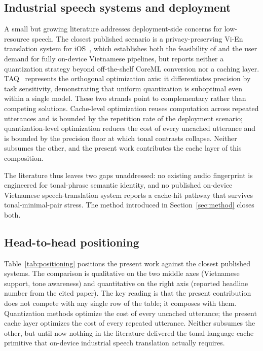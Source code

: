 \documentclass[a4paper,fleqn]{cas-dc}
\begin{document}
\subsection{Industrial speech systems and deployment}\label{sec:related:deployment}

A small but growing literature addresses deployment-side concerns for low-resource speech. The closest published scenario is a privacy-preserving Vi-En translation system for iOS~\citep{le2025privacyios}, which establishes both the feasibility of and the user demand for fully on-device Vietnamese pipelines, but reports neither a quantization strategy beyond off-the-shelf CoreML conversion nor a caching layer. TAQ~\citep{taq2025} represents the orthogonal optimization axis: it differentiates precision by task sensitivity, demonstrating that uniform quantization is suboptimal even within a single model. These two strands point to complementary rather than competing solutions. Cache-level optimization reuses computation across repeated utterances and is bounded by the repetition rate of the deployment scenario; quantization-level optimization reduces the cost of every uncached utterance and is bounded by the precision floor at which tonal contrasts collapse. Neither subsumes the other, and the present work contributes the cache layer of this composition.

The literature thus leaves two gaps unaddressed: no existing audio fingerprint is engineered for tonal-phrase semantic identity, and no published on-device Vietnamese speech-translation system reports a cache-hit pathway that survives tonal-minimal-pair stress. The method introduced in Section~\ref{sec:method} closes both.

\subsection{Head-to-head positioning}\label{sec:related:positioning}

Table~\ref{tab:positioning} positions the present work against the closest published systems. The comparison is qualitative on the two middle axes (Vietnamese support, tone awareness) and quantitative on the right axis (reported headline number from the cited paper). The key reading is that the present contribution does not compete with any single row of the table; it composes with them. Quantization methods optimize the cost of every uncached utterance; the present cache layer optimizes the cost of every repeated utterance. Neither subsumes the other, but until now nothing in the literature delivered the tonal-language cache primitive that on-device industrial speech translation actually requires.
\end{document}
